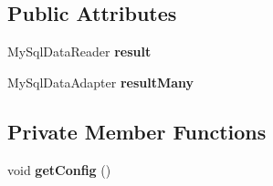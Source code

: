\subsection*{Public Attributes}
\begin{DoxyCompactItemize}
\item 
\hypertarget{classdb_driver_space_1_1db_driver_a81dd7d38b0c50b20fdcce123e436dbfd}{}\label{classdb_driver_space_1_1db_driver_a81dd7d38b0c50b20fdcce123e436dbfd} 
My\+Sql\+Data\+Reader {\bfseries result}
\item 
\hypertarget{classdb_driver_space_1_1db_driver_a42273f46c99c87e75b538c01d304c874}{}\label{classdb_driver_space_1_1db_driver_a42273f46c99c87e75b538c01d304c874} 
My\+Sql\+Data\+Adapter {\bfseries result\+Many}
\end{DoxyCompactItemize}
\subsection*{Private Member Functions}
\begin{DoxyCompactItemize}
\item 
\hypertarget{classdb_driver_space_1_1db_driver_a56922dbb2f65beb6ff1274c68c987186}{}\label{classdb_driver_space_1_1db_driver_a56922dbb2f65beb6ff1274c68c987186} 
void {\bfseries get\+Config} ()
\end{DoxyCompactItemize}
